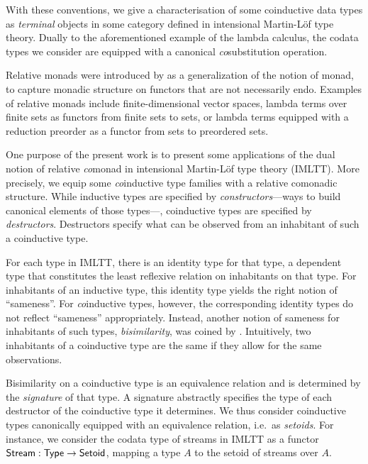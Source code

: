 \documentclass{amsart}
\begin{document}
 With these conventions, we give a characterisation of some coinductive data types as \emph{terminal} objects in some category 
 defined in intensional Martin-L\"of type theory.
 Dually to the aforementioned example of the lambda calculus, the codata types we consider are equipped with a canonical 
 \emph{co}substitution operation.
 
 Relative monads were introduced by \textcite{DBLP:conf/fossacs/AltenkirchCU10} as a generalization of the notion of monad,
 to capture monadic structure on functors that are not necessarily endo.
 Examples of relative monads include finite-dimensional vector spaces, 
 lambda terms over finite sets \parencite{DBLP:conf/fossacs/AltenkirchCU10} as functors from finite sets to sets,
 or lambda terms equipped with a reduction preorder \parencite{ahrens_relmonads} as a functor from sets to preordered sets.
 
 One purpose of the present work is to present some applications of the dual notion of relative \emph{co}monad in intensional Martin-L\"of 
 type theory (IMLTT). More precisely, we equip some \emph{co}inductive type families with a relative comonadic structure.
 While inductive types are specified by \emph{constructors}---ways to build canonical elements of those types---, coinductive types
 are specified by \emph{destructors}. Destructors specify what can be observed from an inhabitant of such a coinductive type.
 
 For each type in IMLTT, there is an identity type for that type, a dependent type that constitutes the least reflexive relation on inhabitants on that type. 
 For inhabitants of an inductive type, this identity type yields the right notion of \enquote{sameness}. 
 For \emph{co}inductive types, however, the corresponding identity types do not reflect \enquote{sameness} appropriately.
 Instead, another notion of sameness for inhabitants of such types, 
 \emph{bisimilarity}, was coined by \textcite{aczel_nonwellfounded}. 
 Intuitively, two inhabitants of a coinductive type are the same if they allow for the same observations.
 
 Bisimilarity on a coinductive type is an equivalence relation and is determined by the \emph{signature} of that type. 
 A signature abstractly specifies the type of each destructor of the coinductive type it determines. 
 We thus
 consider coinductive types canonically equipped with an equivalence relation, i.e.\ as \emph{setoids}.	
 For instance, we consider the codata type of streams in IMLTT as a functor 
 $\mathsf{Stream} : \mathsf{Type} \to \mathsf{Setoid}$, mapping a type $A$ to the setoid of streams over $A$.
 
\end{document}
